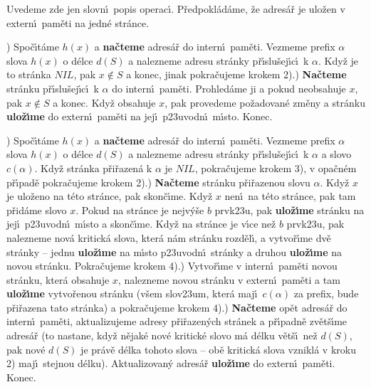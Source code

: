 \documentclass[a4paper,12pt]{article}
\begin{document}
\flushpar Uvedeme zde jen slovn\'\i\ popis operac\'\i . P\v redpokl\'ad\'ame, \v ze adres\'a\v r 
je ulo\v zen v extern\'\i\ pam\v eti na jedn\'e str\'ance.
\medskip

) Spo\v c\'\i t\'ame $h(x)$ a {\bf na\v cteme} adres\'a\v r do intern\'\i\ pam\v eti. 
Vez\-me\-me prefix $\alpha$ slova $h(x)$ o d\'elce $d(S)$ a nalezneme 
adresu str\'anky p\v r\'\i slu\v sej\'\i c\'\i\ k $\alpha$. Kdy\v z je to str\'anka 
$NIL$, pak $x\notin S$ a konec, jinak pokra\v cujeme krokem 
2).) {\bf Na\v cteme} str\'anku p\v r\'\i slu\v sej\'\i c\'\i\ k $\alpha$ do intern\'\i\ 
pam\v eti. Prohle\-d\'a\-me ji a pokud neobsahuje $x$, pak $x\notin 
S$ a 
konec. Kdy\v z obsahuje $x$, pak provedeme po\v zadovan\'e 
zm\v eny a str\'anku {\bf ulo\-\v z\'\i\-me} do extern\'\i\ pam\v eti na jej\'\i\ 
p\accent23uvodn\'\i\ m\'\i sto. Konec.
\medskip

) Spo\v c\'\i t\'ame $h(x)$ a {\bf na\v cteme} adres\'a\v r do intern\'\i\ pam\v eti. 
Vez\-me\-me prefix $\alpha$ slova $h(x)$ o d\'elce $d(S)$ a nalezneme 
adresu str\'anky p\v r\'\i slu\v sej\'\i c\'\i\ k $\alpha$ a slovo $
c(\alpha )$. 
Kdy\v z str\'anka p\v ri\v razen\'a k $\alpha$ je $NIL$, pokra\v cu\-je\-me krokem 
3), v opa\v cn\'em p\v r\'\i pad\v e pokra\v cu\-je\-me krokem 2).\newline 
2) {\bf Na\v cteme} str\'anku p\v ri\v razenou slovu $\alpha$. Kdy\v z $
x$ je 
ulo\v zeno na t\'eto str\'ance, pak skon\v c\'\i me. Kdy\v z $x$ nen\'\i\ na 
t\'eto str\'ance, pak tam p\v rid\'ame slovo $x$. Pokud na str\'ance 
je nejv\'y\v se $b$ prvk\accent23u, pak {\bf ulo\v z\'\i me} str\'anku 
na jej\'\i\ p\accent23uvodn\'\i\ m\'\i sto a skon\v c\'\i me. Kdy\v z na 
str\'ance je v\'\i ce ne\v z $b$ prvk\accent23u, pak nalezneme nov\'a 
kritick\'a slova, 
kter\'a n\'am str\'anku rozd\v el\'\i , a vytvo\v r\'\i me dv\v e str\'anky -- 
jednu {\bf ulo\v z\'\i me} na m\'\i sto p\accent23uvodn\'\i\ str\'anky a 
druhou {\bf ulo\v z\'\i me} na novou str\'anku. Pokra\v cujeme krokem 
4).\newline 
3) Vytvo\v r\'\i me v intern\'\i\ pam\v eti novou str\'anku, kter\'a 
obsahuje $x$, nalezneme novou str\'anku v extern\'\i\ pam\v eti a 
tam {\bf ulo\v z\'\i me} vytvo\v renou str\'anku (v\v sem slov\accent23um, 
kter\'a maj\'\i\ $c(\alpha )$ za prefix, bude p\v ri\v razena tato str\'anka) a 
pokra\v cujeme krokem 4).\newline 
4) {\bf Na\v cteme} op\v et adres\'a\v r do intern\'\i\ pam\v eti, 
aktualizujeme adresy p\v ri\v razen\'ych str\'anek a p\v r\'\i padn\v e 
zv\v et\v s\'\i me adres\'a\v r (to nastane, kdy\v z n\v ejak\'e nov\'e kritick\'e 
slovo m\'a d\'elku v\v et\v s\'\i\ ne\v z $d(S)$, pak nov\'e $d(S
)$ je pr\'av\v e 
d\'elka tohoto slova -- ob\v e kritick\'a slova vznikl\'a v kroku 
2) maj\'\i\ stejnou d\'elku). Aktualizovan\'y adres\'a\v r {\bf ulo\v z\'\i me} do 
extern\'\i\ pam\v eti. Konec.
\medskip
\end{document}
